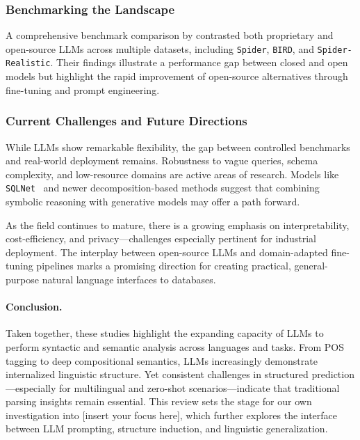 \subsubsection{Benchmarking the Landscape}

A comprehensive benchmark comparison by \citet{gao2024benchmark} contrasted both proprietary and open-source LLMs across multiple datasets, including \texttt{Spider}, \texttt{BIRD}, and \texttt{Spider-Realistic}. Their findings illustrate a performance gap between closed and open models but highlight the rapid improvement of open-source alternatives through fine-tuning and prompt engineering.

\subsubsection{Current Challenges and Future Directions}

While LLMs show remarkable flexibility, the gap between controlled benchmarks and real-world deployment remains. Robustness to vague queries, schema complexity, and low-resource domains are active areas of research. Models like \texttt{SQLNet}~\cite{xu2017sqlnet} and newer decomposition-based methods suggest that combining symbolic reasoning with generative models may offer a path forward.

As the field continues to mature, there is a growing emphasis on interpretability, cost-efficiency, and privacy---challenges especially pertinent for industrial deployment. The interplay between open-source LLMs and domain-adapted fine-tuning pipelines marks a promising direction for creating practical, general-purpose natural language interfaces to databases.

\paragraph{Conclusion.}
Taken together, these studies highlight the expanding capacity of LLMs to perform syntactic and semantic analysis across languages and tasks. From POS tagging to deep compositional semantics, LLMs increasingly demonstrate internalized linguistic structure. Yet consistent challenges in structured prediction—especially for multilingual and zero-shot scenarios—indicate that traditional parsing insights remain essential. This review sets the stage for our own investigation into [insert your focus here], which further explores the interface between LLM prompting, structure induction, and linguistic generalization.

